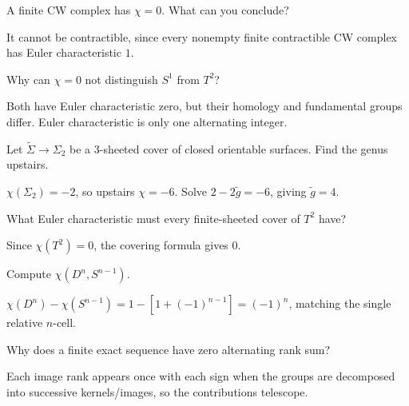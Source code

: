 \begin{problem}\label{prob:viii21-16}
A finite CW complex has \(\chi=0\). What can you conclude?
\end{problem}
\begin{solution}
It cannot be contractible, since every nonempty finite contractible CW complex has Euler characteristic \(1\).
\end{solution}

\begin{problem}\label{prob:viii21-17}
Why can \(\chi=0\) not distinguish \(S^1\) from \(T^2\)?
\end{problem}
\begin{solution}
Both have Euler characteristic zero, but their homology and fundamental groups differ. Euler characteristic is only one alternating integer.
\end{solution}

\begin{problem}\label{prob:viii21-18}
Let \(\widetilde\Sigma\to\Sigma_2\) be a 3-sheeted cover of closed orientable surfaces. Find the genus upstairs.
\end{problem}
\begin{solution}
\(\chi(\Sigma_2)=-2\), so upstairs \(\chi=-6\). Solve \(2-2\tilde g=-6\), giving \(\tilde g=4\).
\end{solution}

\begin{problem}\label{prob:viii21-19}
What Euler characteristic must every finite-sheeted cover of \(T^2\) have?
\end{problem}
\begin{solution}
Since \(\chi(T^2)=0\), the covering formula gives \(0\).
\end{solution}

\begin{problem}\label{prob:viii21-20}
Compute \(\chi(D^n,S^{n-1})\).
\end{problem}
\begin{solution}
\(\chi(D^n)-\chi(S^{n-1})=1-[1+(-1)^{n-1}]=(-1)^n\), matching the single relative \(n\)-cell.
\end{solution}

\begin{problem}\label{prob:viii21-21}
Why does a finite exact sequence have zero alternating rank sum?
\end{problem}
\begin{solution}
Each image rank appears once with each sign when the groups are decomposed into successive kernels/images, so the contributions telescope.
\end{solution}

